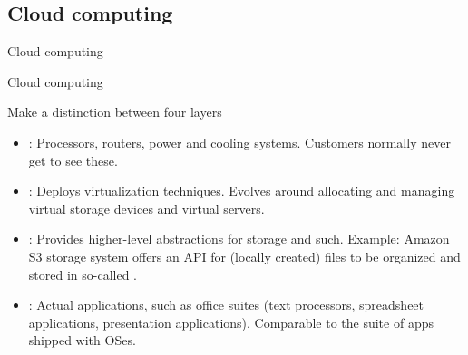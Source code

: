 \subsection{Cloud computing}
\begin{slide}{Cloud computing}
  \begin{centerfig}
  \end{centerfig}
\end{slide}
\begin{slide}{Cloud computing}
  \begin{block}{Make a distinction between four layers}
    \begin{itemize}
    \item {}: Processors, routers, power and cooling systems. Customers normally never get to see these.
    \item {}: Deploys virtualization techniques. Evolves around allocating and managing
      virtual storage devices and virtual servers.
    \item {}: Provides higher-level abstractions for storage and such. Example: Amazon S3 storage
      system offers an API for (locally created) files to be organized and stored in so-called .
    \item {}: Actual applications, such as office suites (text processors, spreadsheet
      applications, presentation applications). Comparable to the suite of apps shipped with OSes.
    \end{itemize}
  \end{block}
\end{slide}
